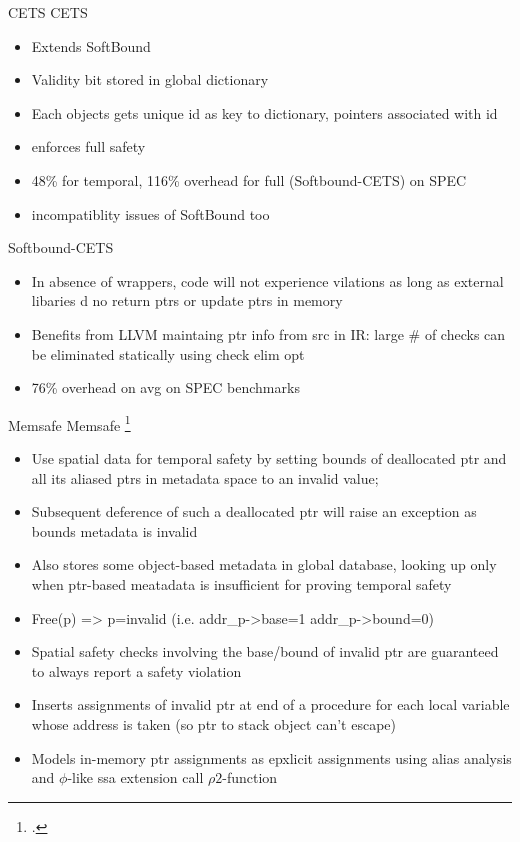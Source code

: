 \documentclass[aspectratio=169]{beamer}
\begin{document}
\begin{frame}{CETS}
  CETS
  \begin{itemize}
    \item Extends SoftBound
    \item Validity bit stored in global dictionary
    \item Each objects gets unique id as key to dictionary, pointers associated with id
    \item enforces full safety
    \item 48\% for temporal, 116\% overhead for full (Softbound-CETS) on SPEC
    \item incompatiblity issues of SoftBound too
   \end{itemize}
\end{frame}

\begin{frame}{Softbound-CETS}
\begin{itemize}
  \item In absence of wrappers, code will not experience vilations as long as external libaries d no return ptrs or update ptrs in memory
  \item Benefits from LLVM maintaing ptr info from src in IR: large \# of checks can be eliminated statically using check elim opt
  \item 76\% overhead on avg on SPEC benchmarks
\end{itemize}
\end{frame}

\begin{frame}{Memsafe}
\footnotesize
    Memsafe \footcite{simpson_memsafe:_2013}
    \begin{itemize}
      \item Use spatial data for temporal safety by setting bounds of deallocated ptr and all its aliased ptrs in metadata space to an invalid value;
      \item Subsequent deference of such a deallocated ptr will raise an exception as bounds metadata is invalid
      \item Also stores some object-based metadata in global database, looking up only when ptr-based meatadata is insufficient for proving temporal safety
      \item Free(p) => p=invalid (i.e. addr\_p->base=1 addr\_p->bound=0)
      \item Spatial safety checks involving the base/bound of invalid ptr are guaranteed to always report a safety violation
      \item Inserts assignments of invalid ptr at end of a procedure for each local variable whose address is taken (so ptr to stack object can't escape)
      \item Models in-memory ptr assignments as epxlicit assignments using alias analysis and $\phi$-like ssa extension call $\rho2$-function
    \end{itemize}
\end{frame}
\end{document}
